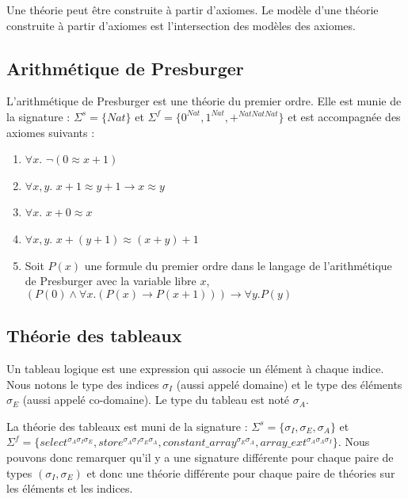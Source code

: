 \documentclass[11pt,openany]{article}
\begin{document}
	Une th\'eorie peut \^etre construite \`a partir d'axiomes. Le mod\`ele d'une th\'eorie construite \`a partir d'axiomes est l'intersection des mod\`eles des axiomes.

	\subsection{Arithm\'etique de Presburger}
		L'arithm\'etique de Presburger est une th\'eorie du premier ordre. Elle est munie de la signature : $\Sigma^s = \{Nat\}$ et $\Sigma^{f}=\{0^{Nat},1^{Nat},+^{NatNatNat}\}$ et est accompagn\'ee des axiomes suivants :
		\begin{enumerate}
		\item $\forall x.$ $\neg(0\approx x+1)$
		\item $\forall x,y.$ $x + 1\approx y+1\rightarrow x\approx y$
		\item $\forall x.$ $x+0\approx x$
		\item $\forall x,y.$ $x+(y+1)\approx (x+y)+1$
		\item Soit $P(x)$ une formule du premier ordre dans le langage de l'arithm\'etique de Presburger avec la variable libre $x$,\\
		$(P(0)\land\forall x.(P(x)\rightarrow P(x+1)))\rightarrow\forall y. P(y)$
		\end{enumerate}
	\subsection{Th\'eorie des tableaux}	
		Un tableau logique est une expression qui associe un \'el\'ement \`a chaque indice. Nous notons le type des indices $\sigma_I$ (aussi appel\'e domaine) et le type des \'el\'ements $\sigma_E$ (aussi appel\'e co-domaine). Le type du tableau est not\'e $\sigma_A$.
		
		La th\'eorie des tableaux est muni de la signature : $\Sigma^s=\{\sigma_I,\sigma_E,\sigma_A\}$ et $\Sigma^f=\{select^{\sigma_A\sigma_I\sigma_E},store^{\sigma_A\sigma_I\sigma_E\sigma_A},constant\_array^{\sigma_E\sigma_A},array\_ext^{\sigma_A\sigma_A\sigma_I}\}$. Nous pouvons donc remarquer qu'il y a une signature diff\'erente pour chaque paire de types $(\sigma_I,\sigma_E)$ et donc une th\'eorie diff\'erente pour chaque paire de th\'eories sur les \'el\'ements et les indices.
	
\end{document}
